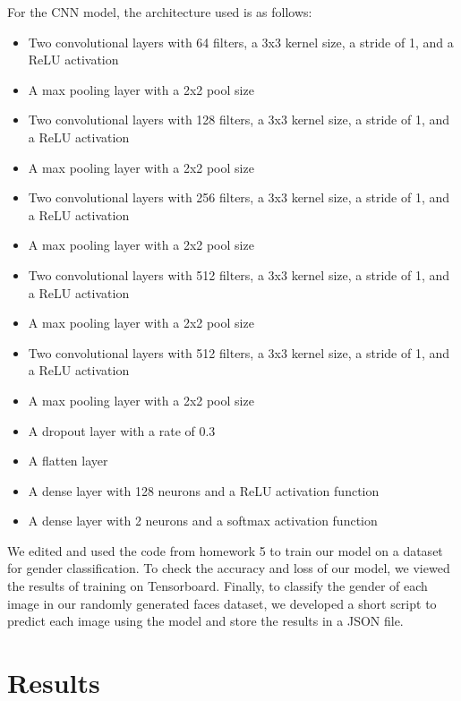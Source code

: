 For the CNN model, the architecture used is as follows:
\begin{itemize}
    \item Two convolutional layers with 64 filters, a 3x3 kernel size, a stride of 1, and a ReLU activation
    \item A max pooling layer with a 2x2 pool size
    \item Two convolutional layers with 128 filters, a 3x3 kernel size, a stride of 1, and a ReLU activation
    \item A max pooling layer with a 2x2 pool size
    \item Two convolutional layers with 256 filters, a 3x3 kernel size, a stride of 1, and a ReLU activation
    \item A max pooling layer with a 2x2 pool size
    \item Two convolutional layers with 512 filters, a 3x3 kernel size, a stride of 1, and a ReLU activation
    \item A max pooling layer with a 2x2 pool size
    \item Two convolutional layers with 512 filters, a 3x3 kernel size, a stride of 1, and a ReLU activation
    \item A max pooling layer with a 2x2 pool size
    \item A dropout layer with a rate of 0.3
    \item A flatten layer
    \item A dense layer with 128 neurons and a ReLU activation function
    \item A dense layer with 2 neurons and a softmax activation function
\end{itemize}

We edited and used the code from homework 5 to train our model on a dataset for gender classification. To check
the accuracy and loss of our model, we viewed the results of training on Tensorboard. Finally, to classify the gender of
each image in our randomly generated faces dataset, we developed a short script to predict each image using the model and
store the results in a JSON file.

\section{Results}


